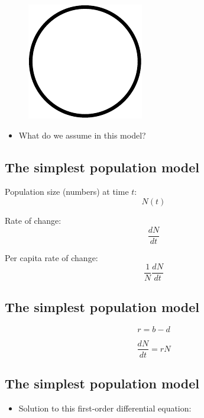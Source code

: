 \documentclass[
  letterpaper,
  DIV=11,
  numbers=noendperiod]{scrartcl}
\providecommand{\tightlist}{%
  \setlength{\itemsep}{0pt}\setlength{\parskip}{0pt}}\usepackage{longtable,booktabs,array}
\begin{document}
\begin{figure}[H]

{\centering \includegraphics{ecological_interactions_files/figure-pdf/unnamed-chunk-1-1.pdf}

}

\end{figure}

\begin{itemize}
\tightlist
\item
  What do we assume in this model?
\end{itemize}

\hypertarget{the-simplest-population-model}{%
\subsection{The simplest population
model}\label{the-simplest-population-model}}

Population size (numbers) at time \(t\): \[N(t)\]

Rate of change: \[\frac{dN}{dt}\]

Per capita rate of change: \[\frac{1}{N}\frac{dN}{dt}\]

\hypertarget{the-simplest-population-model-1}{%
\subsection{The simplest population
model}\label{the-simplest-population-model-1}}

\[r = b - d\]

\[\frac{dN}{dt}=rN\]

\hypertarget{the-simplest-population-model-2}{%
\subsection{The simplest population
model}\label{the-simplest-population-model-2}}

\begin{itemize}
\tightlist
\item
  Solution to this first-order differential equation:
\end{itemize}
\end{document}
